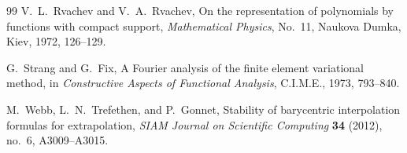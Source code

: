 \documentclass[11pt,oneside]{book}
\numberwithin{equation}{chapter}
\theoremstyle{definition}
\theoremstyle{remark}
\begin{document}
\begin{thebibliography}{99}
V.~L.~Rvachev and V.~A.~Rvachev,
\newblock On the representation of polynomials by functions with compact
support,
\newblock \emph{Mathematical Physics}, No.~11, Naukova Dumka, Kiev, 1972,
126--129.

G.~Strang and G.~Fix,
\newblock A Fourier analysis of the finite element variational method,
\newblock in \emph{Constructive Aspects of Functional Analysis}, C.I.M.E.,
1973, 793--840.

M.~Webb, L.~N.~Trefethen, and P.~Gonnet,
\newblock Stability of barycentric interpolation formulas for extrapolation,
\newblock \emph{SIAM Journal on Scientific Computing} \textbf{34} (2012),
no.~6, A3009--A3015.

\end{thebibliography}
\end{document}

